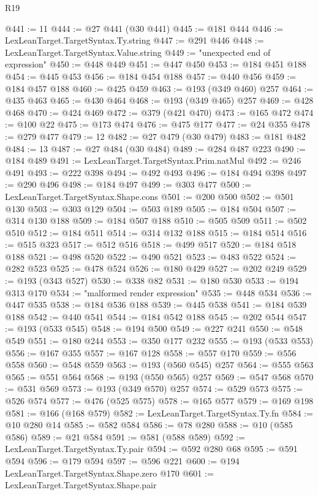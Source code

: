 \begin{lexlean}{R19}
\begin{coremodule}
@441 := 11
@444 := @27 @441 (@30 @441)
@445 := @181 @444
@446 := LexLeanTarget.TargetSyntax.Ty.string
@447 := @291 @446
@448 := LexLeanTarget.TargetSyntax.Value.string
@449 := "unexpected end of expression"
@450 := @448 @449
@451 := @447 @450
@453 := @184 @451 @188
@454 := @445 @453
@456 := @184 @454 @188
@457 := @440 @456
@459 := @184 @457 @188
@460 := @425 @459
@463 := @193 (@349 @460) @257
@464 := @435 @463
@465 := @430 @464
@468 := @193 (@349 @465) @257
@469 := @428 @468
@470 := @424 @469
@472 := @379 (@421 @470)
@473 := @165 @472
@474 := @100 @22
@475 := @173 @474
@476 := @475 @177
@477 := @24 @355
@478 := @279 @477
@479 := 12
@482 := @27 @479 (@30 @479)
@483 := @181 @482
@484 := 13
@487 := @27 @484 (@30 @484)
@489 := @284 @487 @223
@490 := @184 @489
@491 := LexLeanTarget.TargetSyntax.Prim.natMul
@492 := @246 @491
@493 := @222 @398
@494 := @492 @493
@496 := @184 @494 @398
@497 := @290 @496
@498 := @184 @497
@499 := @303 @477
@500 := LexLeanTarget.TargetSyntax.Shape.cons
@501 := @200 @500
@502 := @501 @130
@503 := @303 @129
@504 := @503 @189
@505 := @184 @504
@507 := @314 @130 @188
@509 := @184 @507 @188
@510 := @505 @509
@511 := @502 @510
@512 := @184 @511
@514 := @314 @132 @188
@515 := @184 @514
@516 := @515 @323
@517 := @512 @516
@518 := @499 @517
@520 := @184 @518 @188
@521 := @498 @520
@522 := @490 @521
@523 := @483 @522
@524 := @282 @523
@525 := @478 @524
@526 := @180 @429
@527 := @202 @249
@529 := @193 (@343 @527)
@530 := @338 @82
@531 := @180 @530
@533 := @194 @313 @170
@534 := "malformed render expression"
@535 := @448 @534
@536 := @447 @535
@538 := @184 @536 @188
@539 := @445 @538
@541 := @184 @539 @188
@542 := @440 @541
@544 := @184 @542 @188
@545 := @202 @544
@547 := @193 (@533 @545)
@548 := @194 @500
@549 := @227 @241
@550 := @548 @549
@551 := @180 @244
@553 := @350 @177 @232
@555 := @193 (@533 @553)
@556 := @167 @355
@557 := @167 @128
@558 := @557 @170
@559 := @556 @558
@560 := @548 @559
@563 := @193 (@560 @545) @257
@564 := @555 @563
@565 := @551 @564
@568 := @193 (@550 @565) @257
@569 := @547 @568
@570 := @531 @569
@573 := @193 (@349 @570) @257
@574 := @529 @573
@575 := @526 @574
@577 := @476 (@525 @575)
@578 := @165 @577
@579 := @169 @198
@581 := @166 (@168 @579)
@582 := LexLeanTarget.TargetSyntax.Ty.fn
@584 := @10 @280 @14
@585 := @582 @584
@586 := @78 @280
@588 := @10 (@585 @586)
@589 := @21 @584
@591 := @581 (@588 @589)
@592 := LexLeanTarget.TargetSyntax.Ty.pair
@594 := @592 @280 @68
@595 := @591 @594
@596 := @179 @594
@597 := @596 @221
@600 := @194 LexLeanTarget.TargetSyntax.Shape.zero @170
@601 := LexLeanTarget.TargetSyntax.Shape.pair

\end{coremodule}
\end{lexlean}
